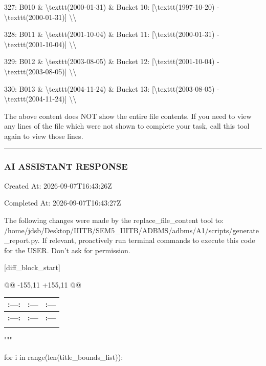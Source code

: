 \documentclass[11pt,a4paper]{article}
\begin{document}
327: B010 \& \textbackslash{}texttt{(2000-01-31)} \& Bucket 10: [\textbackslash{}texttt{(1997-10-20)} - \textbackslash{}texttt{(2000-01-31)}] \textbackslash{}\textbackslash{}

328: B011 \& \textbackslash{}texttt{(2001-10-04)} \& Bucket 11: [\textbackslash{}texttt{(2000-01-31)} - \textbackslash{}texttt{(2001-10-04)}] \textbackslash{}\textbackslash{}

329: B012 \& \textbackslash{}texttt{(2003-08-05)} \& Bucket 12: [\textbackslash{}texttt{(2001-10-04)} - \textbackslash{}texttt{(2003-08-05)}] \textbackslash{}\textbackslash{}

330: B013 \& \textbackslash{}texttt{(2004-11-24)} \& Bucket 13: [\textbackslash{}texttt{(2003-08-05)} - \textbackslash{}texttt{(2004-11-24)}] \textbackslash{}\textbackslash{}

The above content does NOT show the entire file contents. If you need to view any lines of the file which were not shown to complete your task, call this tool again to view those lines.


\hrule

\subsubsection{AI ASSISTANT RESPONSE}

Created At: 2026-09-07T16:43:26Z

Completed At: 2026-09-07T16:43:27Z

The following changes were made by the replace\_file\_content tool to: /home/jdsb/Desktop/IIITB/SEM5\_IIITB/ADBMS/adbms/A1/scripts/generate\_report.py. If relevant, proactively run terminal commands to execute this code for the USER. Don't ask for permission.

[diff\_block\_start]

@@ -155,11 +155,11 @@

{\begingroup
\small
\setlength{\tabcolsep}{5pt}
\begin{xltabular}{\textwidth}{l | C | C}
\toprule
\textbf{:---:} & \textbf{:---} & \textbf{:---} \\
\midrule
\endfirsthead
\toprule
\textbf{:---:} & \textbf{:---} & \textbf{:---} \\
\midrule
\endfirsthead
\endhead
\bottomrule
\endfoot
\bottomrule
\endlastfoot
\end{xltabular}
\endgroup}

"""

for i in range(len(title\_bounds\_list)):
\end{document}
